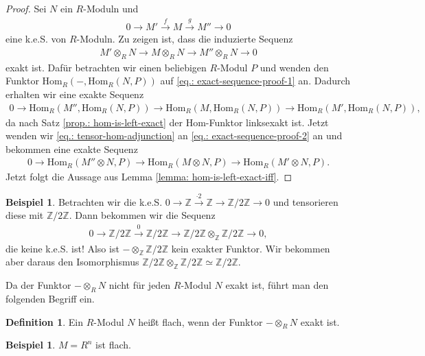 \documentclass[reqno,12pt]{article}
\numberwithin{equation}{section}
\newcommand{\bZ}{\mathbb{Z}}
\newcommand{\iso}{\simeq}
\newcommand{\Hom}{\text{Hom}}
\theoremstyle{plain}
\theoremstyle{definition}
\newtheorem{definition}[thm]{Definition}
\newtheorem{example}[thm]{Beispiel}
\newcommand{\blank}{{-}}
\begin{document}
\begin{proof}
Sei $N$ ein $R$-Moduln und
\begin{align}\label{eq.: exact-sequence-proof-1}
0 \to M' \overset{f}{\to}  M \overset{g}{\to} M'' \to 0
\end{align}
eine k.e.S. von $R$-Moduln. Zu zeigen ist, dass die induzierte Sequenz
\begin{align*}
M' \otimes_R N \to  M \otimes_R N \to M'' \otimes_R N \to 0
\end{align*}
exakt ist. Dafür betrachten wir einen beliebigen $R$-Modul $P$ und wenden den Funktor $\Hom_R(\blank, \Hom_R(N,P))$ auf \eqref{eq.: exact-sequence-proof-1} an. Dadurch erhalten wir eine exakte Sequenz
\begin{align}\label{eq.: exact-sequence-proof-2}
0 \to \Hom_R(M'', \Hom_R(N,P)) \to \Hom_R(M, \Hom_R(N,P)) \to \Hom_R(M', \Hom_R(N,P)),
\end{align}
da nach Satz \ref{prop.: hom-is-left-exact} der $\Hom$-Funktor linksexakt ist. Jetzt wenden wir \eqref{eq.: tensor-hom-adjunction} an \eqref{eq.: exact-sequence-proof-2} an und bekommen eine exakte Sequenz
\begin{align}\label{eq.: exact-sequence-proof-3}
0 \to \Hom_R(M'' \otimes N, P) \to \Hom_R(M \otimes N, P) \to \Hom_R(M' \otimes N, P).
\end{align}
Jetzt folgt die Aussage aus Lemma \ref{lemma: hom-is-left-exact-iff}.
\end{proof}


\begin{example}
Betrachten wir die k.e.S. $0 \to \bZ \overset{\cdot 2}{\to} \bZ \to \bZ/2 \bZ \to 0$ und tensorieren diese mit $\bZ/2 \bZ$. Dann bekommen wir die Sequenz
\begin{align*}
0 \to \bZ/2\bZ \overset{0}{\to} \bZ/2\bZ \to \bZ/2\bZ \otimes_{\bZ} \bZ/2\bZ \to 0,
\end{align*}
die keine k.e.S. ist! Also ist $\blank \otimes_{\bZ} \bZ/2\bZ$ kein exakter Funktor. Wir bekommen aber daraus den Isomorphismus $\bZ/2\bZ \otimes_{\bZ} \bZ/2\bZ \iso \bZ/2\bZ$.
\end{example}


\medskip
Da der Funktor $\blank \otimes_R N$ nicht für jeden $R$-Modul $N$ exakt ist, führt man den folgenden Begriff ein.
\begin{definition}
Ein $R$-Modul $N$ heißt {\sf flach}, wenn der Funktor $\blank \otimes_R N$ exakt ist.
\end{definition}

\begin{example}
$M = R^n$ ist flach.
\end{example}
\end{document}
